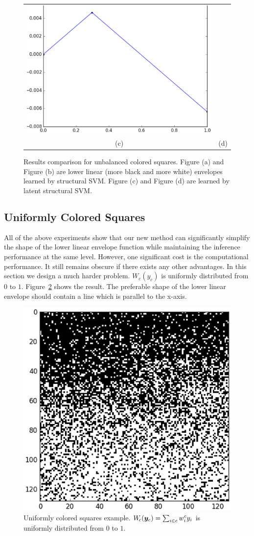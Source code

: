 \begin{figure}[ht]
\begin{tabular}{cc}
                                                                              \includegraphics[width=0.5\columnwidth]{Part2/figures/unba_white_res_new.png}\\
    {\small (c)} & {\small (d)} 
  \end{tabular}
  \caption{\label{fig:unba_results} Results comparison for
    unbalanced colored squares. Figure (a) and Figure (b) are
    lower linear (more black and more white) envelopes learned by
    structural SVM. Figure (c) and Figure (d) are learned by
    latent structural SVM.}
\end{figure}

\subsection{Uniformly Colored Squares}
\label{sec:unif-distr-squar}

All of the above experiments show that our new method can
significantly simplify the shape of the lower linear envelope
function while maintaining the inference performance at the same
level. However, one significant cost is the computational
performance. It still remains obscure if there exists any other
advantages. In this section we design a much harder problem.
$W_c(y_c)$ is uniformly distributed from $0$ to $1$.
Figure~\ref{fig:ba_gt} shows the result. The preferable shape of
the lower linear envelope should contain a line which is parallel
to the x-axis.

\begin{figure}[t]
  \centering
  \includegraphics[width=0.5\columnwidth]{Part2/figures/ba_gt.png}
  \caption{\label{fig:ba_gt} Uniformly colored squares example.
    $W_{\!c}({\bm{y}}_c) = \sum_{i \in c} w^c_i y_i$ is uniformly
    distributed from $0$ to $1$.}
\end{figure}

